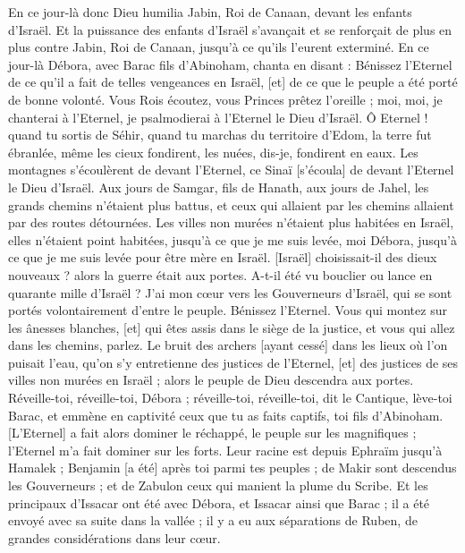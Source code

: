 \begin{multicols}{2}
En ce jour-là donc Dieu humilia Jabin, Roi de Canaan, devant les enfants d'Israël.
Et la puissance des enfants d'Israël s'avançait et se renforçait de plus en plus contre Jabin, Roi de Canaan, jusqu'à ce qu'ils l'eurent exterminé.
\VerseOne{}En ce jour-là Débora, avec Barac fils d'Abinoham, chanta en disant :
Bénissez l'Eternel de ce qu'il a fait de telles vengeances en Israël, [et] de ce que le peuple a été porté de bonne volonté.
Vous Rois écoutez, vous Princes prêtez l'oreille ; moi, moi, je chanterai à l'Eternel, je psalmodierai à l'Eternel le Dieu d'Israël.
Ô Eternel ! quand tu sortis de Séhir, quand tu marchas du territoire d'Edom, la terre fut ébranlée, même les cieux fondirent, les nuées, dis-je, fondirent en eaux.
Les montagnes s'écoulèrent de devant l'Eternel, ce Sinaï [s'écoula] de devant l'Eternel le Dieu d'Israël.
Aux jours de Samgar, fils de Hanath, aux jours de Jahel, les grands chemins n'étaient plus battus, et ceux qui allaient par les chemins allaient par des routes détournées.
Les villes non murées n'étaient plus habitées en Israël, elles n'étaient point habitées, jusqu'à ce que je me suis levée, moi Débora, jusqu'à ce que je me suis levée pour être mère en Israël.
[Israël] choisissait-il des dieux nouveaux ? alors la guerre était aux portes. A-t-il été vu bouclier ou lance en quarante mille d'Israël ?
J'ai mon cœur vers les Gouverneurs d'Israël, qui se sont portés volontairement d'entre le peuple. Bénissez l'Eternel.
Vous qui montez sur les ânesses blanches, [et] qui êtes assis dans le siège de la justice, et vous qui allez dans les chemins, parlez.
Le bruit des archers [ayant cessé] dans les lieux où l'on puisait l'eau, qu'on s'y entretienne des justices de l'Eternel, [et] des justices de ses villes non murées en Israël ; alors le peuple de Dieu descendra aux portes.
Réveille-toi, réveille-toi, Débora ; réveille-toi, réveille-toi, dit le Cantique, lève-toi Barac, et emmène en captivité ceux que tu as faits captifs, toi fils d'Abinoham.
[L'Eternel] a fait alors dominer le réchappé, le peuple sur les magnifiques ; l'Eternel m'a fait dominer sur les forts.
Leur racine est depuis Ephraïm jusqu'à Hamalek ; Benjamin [a été] après toi parmi tes peuples ; de Makir sont descendus les Gouverneurs ; et de Zabulon ceux qui manient la plume du Scribe.
Et les principaux d'Issacar ont été avec Débora, et Issacar ainsi que Barac ; il a été envoyé avec sa suite dans la vallée ; il y a eu aux séparations de Ruben, de grandes considérations dans leur cœur.

\end{multicols}
